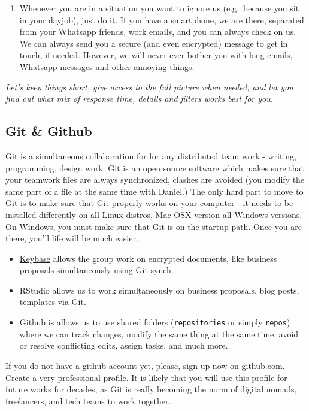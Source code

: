\documentclass[
  a4paper,
  openany, a4paper, oneside]{book}
\providecommand{\tightlist}{%
  \setlength{\itemsep}{0pt}\setlength{\parskip}{0pt}}
\begin{document}
\begin{enumerate}
\def\labelenumi{\arabic{enumi}.}
\setcounter{enumi}{8}
\tightlist
\item
  Whenever you are in a situation you want to ignore us (e.g.~because you sit in your dayjob), just do it. If you have a smartphone, we are there, separated from your Whatsapp friends, work emails, and you can always check on us. We can always send you a secure (and even encrypted) message to get in touch, if needed. However, we will never ever bother you with long emails, Whatsapp messages and other annoying things.
\end{enumerate}

\emph{Let's keep things short, give access to the full picture when needed, and let you find out what mix of response time, details and filters works best for you.}

\hypertarget{github}{%
\subsection{Git \& Github}\label{github}}

Git is a simultaneous collaboration for for any distributed team work - writing, programming, design work. Git is an open source software which makes sure that your teamwork files are always synchronized, clashes are avoided (you modify the same part of a file at the same time with Daniel.) The only hard part to move to Git is to make sure that Git properly works on your computer - it needs to be installed differently on all Linux distros, Mac OSX version all Windows versions. On Windows, you must make sure that Git is on the startup path. Once you are there, you'll life will be much easier.

\begin{itemize}
\item
  \protect\hyperlink{keybase}{Keybase} allows the group work on encrypted documents, like business proposals simultaneously using Git synch.
\item
  RStudio allows us to work simultaneously on business proposals, blog posts, templates via Git.
\item
  Github is allows us to use shared folders (\texttt{repositories} or simply \texttt{repos}) where we can track changes, modify the same thing at the same time, avoid or resolve conflicting edits, assign tasks, and much more.
\end{itemize}

If you do not have a github account yet, please, sign up now on \href{https://github.com/}{github.com}. Create a very professional profile. It is likely that you will use this profile for future works for decades, as Git is really becoming the norm of digital nomads, freelancers, and tech teams to work together.
\end{document}
